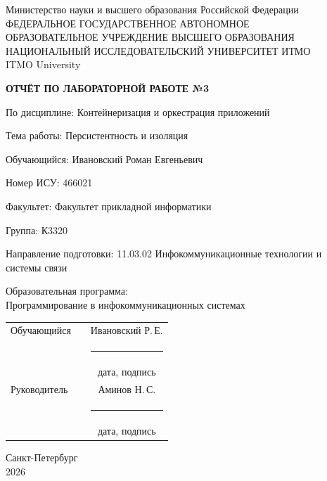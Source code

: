 \documentclass[14pt,a4paper,oneside]{extreport}
\newcommand{\LabNumber}{3}
\newcommand{\LabTitle}{Персистентность и изоляция}
\newcommand{\CourseName}{Контейнеризация и оркестрация приложений}
\newcommand{\StudentName}{Ивановский Роман Евгеньевич}
\newcommand{\StudentShortName}{Ивановский Р.\,Е.}
\newcommand{\StudentISU}{466021}
\newcommand{\StudentGroup}{К3320}
\newcommand{\FacultyName}{Факультет прикладной информатики}
\newcommand{\DegreeProgramme}{11.03.02 Инфокоммуникационные технологии и системы связи}
\newcommand{\EducationProgramme}{Программирование в инфокоммуникационных системах}
\newcommand{\TeacherName}{Аминов Н.\,С.}
\newcommand{\ReportCity}{Санкт-Петербург}
\newcommand{\ReportYear}{2026}
\begin{document}
\begin{titlepage}
  \thispagestyle{empty}
  \begin{center}
    \fontsize{12pt}{16pt}\selectfont
    Министерство науки и высшего образования Российской Федерации\\[0.25\baselineskip]
    ФЕДЕРАЛЬНОЕ ГОСУДАРСТВЕННОЕ АВТОНОМНОЕ\\
    ОБРАЗОВАТЕЛЬНОЕ УЧРЕЖДЕНИЕ ВЫСШЕГО ОБРАЗОВАНИЯ\\[0.25\baselineskip]
    НАЦИОНАЛЬНЫЙ ИССЛЕДОВАТЕЛЬСКИЙ УНИВЕРСИТЕТ ИТМО\\
    ITMO University
  \end{center}
  \vspace{0.8\baselineskip}
  \begin{center}
    \textbf{ОТЧЁТ ПО ЛАБОРАТОРНОЙ РАБОТЕ №\LabNumber}
  \end{center}
  \vspace{0.4\baselineskip}
  \begingroup
  \setlength{\parindent}{0pt}
  По дисциплине: \CourseName\par\medskip
  Тема работы: \LabTitle\par\medskip
  Обучающийся: \StudentName\par\medskip
  Номер ИСУ: \StudentISU\par\medskip
  Факультет: \FacultyName\par\medskip
  Группа: \StudentGroup\par\medskip
  Направление подготовки: \DegreeProgramme\par\medskip
  Образовательная программа:\\\EducationProgramme\par
  \endgroup
  \vfill
  \begin{tabularx}{\textwidth}{@{}lXc@{}}
    Обучающийся & & \StudentShortName\\
    & & \rule{38mm}{0.4pt}\\[-0.25\baselineskip]
    & & {\fontsize{12pt}{14pt}\selectfont дата, подпись}\\[0.6\baselineskip]
    Руководитель & & \TeacherName\\
    & & \rule{38mm}{0.4pt}\\[-0.25\baselineskip]
    & & {\fontsize{12pt}{14pt}\selectfont дата, подпись}
  \end{tabularx}
  \vfill
  \begin{center}
    \ReportCity\\
    \ReportYear
  \end{center}
\end{titlepage}
\setcounter{page}{2}
\tableofcontents

\end{document}
